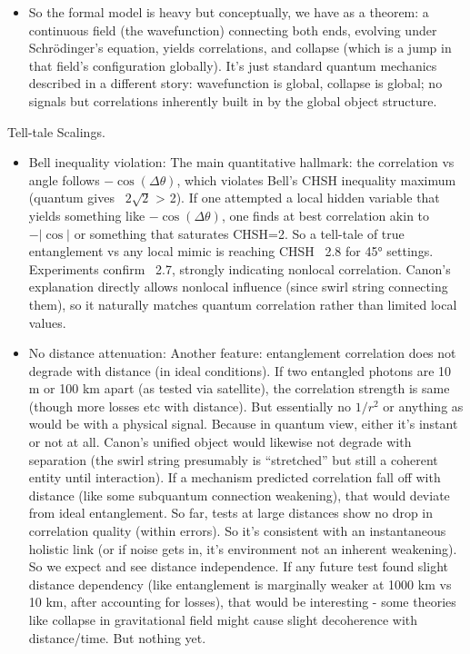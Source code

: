 \documentclass[11pt]{article}
\begin{document}
\begin{itemize}
\item 
So the formal model is heavy but conceptually, we have as a theorem: a continuous field (the wavefunction) connecting both ends, evolving under Schrödinger’s equation, yields correlations, and collapse (which is a jump in that field's configuration globally). It's just standard quantum mechanics described in a different story: wavefunction is global, collapse is global; no signals but correlations inherently built in by the global object structure.




\end{itemize}

Tell-tale Scalings.


\begin{itemize}

\item 
Bell inequality violation: The main quantitative hallmark: the correlation vs angle follows $-\cos(\Delta\theta)$, which violates Bell’s CHSH inequality maximum (quantum gives ~$2\sqrt{2}$ > 2). If one attempted a local hidden variable that yields something like $-\cos(\Delta\theta)$, one finds at best correlation akin to $-|\cos|$ or something that saturates CHSH=2. So a tell-tale of true entanglement vs any local mimic is reaching CHSH ~2.8 for 45° settings. Experiments confirm ~2.7, strongly indicating nonlocal correlation. Canon’s explanation directly allows nonlocal influence (since swirl string connecting them), so it naturally matches quantum correlation rather than limited local values.




\item 
No distance attenuation: Another feature: entanglement correlation does not degrade with distance (in ideal conditions). If two entangled photons are 10 m or 100 km apart (as tested via satellite), the correlation strength is same (though more losses etc with distance). But essentially no $1/r^2$ or anything as would be with a physical signal. Because in quantum view, either it’s instant or not at all. Canon’s unified object would likewise not degrade with separation (the swirl string presumably is “stretched” but still a coherent entity until interaction). If a mechanism predicted correlation fall off with distance (like some subquantum connection weakening), that would deviate from ideal entanglement. So far, tests at large distances show no drop in correlation quality (within errors). So it's consistent with an instantaneous holistic link (or if noise gets in, it's environment not an inherent weakening). So we expect and see distance independence. If any future test found slight distance dependency (like entanglement is marginally weaker at 1000 km vs 10 km, after accounting for losses), that would be interesting - some theories like collapse in gravitational field might cause slight decoherence with distance/time. But nothing yet.





\end{itemize}
\end{document}
